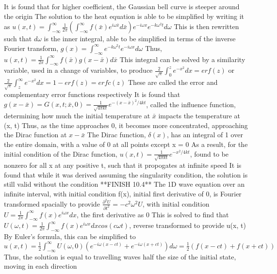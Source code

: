 \documentclass[11 pt, twoside]{article}
\newenvironment{outline*}
{
	\begin{outline}[enumerate]
	}
	{\end{outline}
}
\newcommand\pd[2]{\frac{\partial #1}{\partial #2}}
\begin{document}
\begin{outline*}
		\3 It is found that for higher coefficient, the Gaussian bell curve is steeper around the origin
\1 The solution to the heat equation is able to be simplified by writing it as $u(x, t) = \int^{\infty}_{-\infty}\frac{1}{2\pi}(\int^{\infty}_{-\infty}f(\bar{x})e^{i\omega \bar{x}}d\bar{x})e^{-i\omega x}e^{-k\omega^2 t}d\omega$
	\2 This is then rewritten such that $d\omega$ is the inner integral, able to be simplified in terms of the inverse Fourier transform, $g(x) = \int^{\infty}_{-\infty} e^{-k\omega^2 t}e^{-i\omega x}d\omega$
		\3 Thus, $u(x, t) = \frac{1}{2\pi}\int^{\infty}_{-\infty}f(\bar{x})g(x - \bar{x})d\bar{x}$
			\4 This integral can be solved by a similarity variable, used in a change of variables, to produce $\frac{2}{\sqrt{\pi}} \int^z_0 e^{-x^2}dx = erf(z)$ or $\frac{2}{\sqrt{\pi}}\int^{\infty}_z e^{-x^2}dx = 1 - erf(z) = erfc(z)$
			\4 These are called the error and complementary error functions respectively
		\3 It is found that $g(x - \bar{x}) = G(x, t;\bar{x}, 0) = \frac{1}{\sqrt{4\pi kt}}e^{-(x - \bar{x})^2/4kt}$, called the influence function, determining how much the initial temperature at $\bar{x}$ impacts the temperature at (x, t)
			\4 Thus, as the time approaches 0, it becomes more concentrated, approaching the Dirac function at $x - \bar{x}$
			\4 The Dirac function, $\delta(x)$, has an integral of 1 over the entire domain, with a value of 0 at all points except x = 0
			\4 As a result, for the initial condition of the Dirac function, $u(x, t) = \frac{1}{\sqrt{4\pi kt}}e^{-x^2/4kt}$, found to be nonzero for all x at any positive t, such that it propogates at infinite speed
		\3 It is found that while it was derived assuming the singularity condition, the solution is still valid without the condition
\1 **FINISH 10.4**
\1 The 1D wave equation over an infinite interval, with initial condition f(x), initial first derivative of 0, is Fourier transformed spacially to provide $\pd{^2U}{t^2} = -c^2\omega^2U$, with initial condition $U = \frac{1}{2\pi}\int^{\infty}_{-\infty}f(x)e^{i\omega x}dx$, the first derivative as 0
	\2 This is solved to find that $U(\omega, t) = \frac{1}{2\pi}\int^{\infty}_{-\infty}f(x)e^{i\omega x}dx cos(c\omega t)$, reverse transformed to provide u(x, t)
		\3 By Euler's formula, this can be simplified to $u(x, t) = \frac{1}{2}\int^{\infty}_{-\infty}U(\omega, 0)(e^{-i\omega(x - ct)} + e^{-i\omega(x + ct)})d\omega = \frac{1}{2}(f(x - ct) + f(x + ct))$
		\3 Thus, the solution is equal to travelling waves half the size of the initial state, moving in each direction
\end{outline*}
\end{document}
